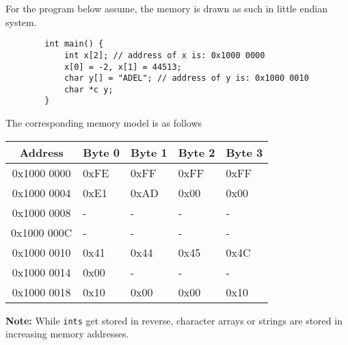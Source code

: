 \documentclass[12pt]{article}
\begin{document}
\begin{example}
    For the program below assume, the memory is drawn as such in little endian system.

    \begin{lstlisting}
        int main() {
            int x[2]; // address of x is: 0x1000 0000
            x[0] = -2, x[1] = 44513;
            char y[] = "ADEL"; // address of y is: 0x1000 0010
            char *c y;
        }
    \end{lstlisting}

    The corresponding memory model is as follows

    \begin{center}
        \begin{tabular}{|c|>{\centering\arraybackslash}p{2cm}|>{\centering\arraybackslash}p{2cm}|>{\centering\arraybackslash}p{2cm}|>{\centering\arraybackslash}p{2cm}|}
            \hline
            \textbf{Address} & \textbf{Byte 0} & \textbf{Byte 1} & \textbf{Byte 2} & \textbf{Byte 3} \\
            \hline
            0x1000 0000      & 0xFE            & 0xFF            & 0xFF            & 0xFF            \\
            \hline
            0x1000 0004      & 0xE1            & 0xAD            & 0x00            & 0x00            \\
            \hline
            0x1000 0008      & -               & -               & -               & -               \\
            \hline
            0x1000 000C      & -               & -               & -               & -               \\
            \hline
            0x1000 0010      & 0x41            & 0x44            & 0x45            & 0x4C            \\
            \hline
            0x1000 0014      & 0x00            & -               & -               & -               \\
            \hline
            0x1000 0018      & 0x10            & 0x00            & 0x00            & 0x10            \\
            \hline
        \end{tabular}
    \end{center}

    \textbf{Note:} While \lstinline{ints} get stored in reverse, character arrays or strings are stored in increasing memory addresses.


\end{example}
\end{document}
